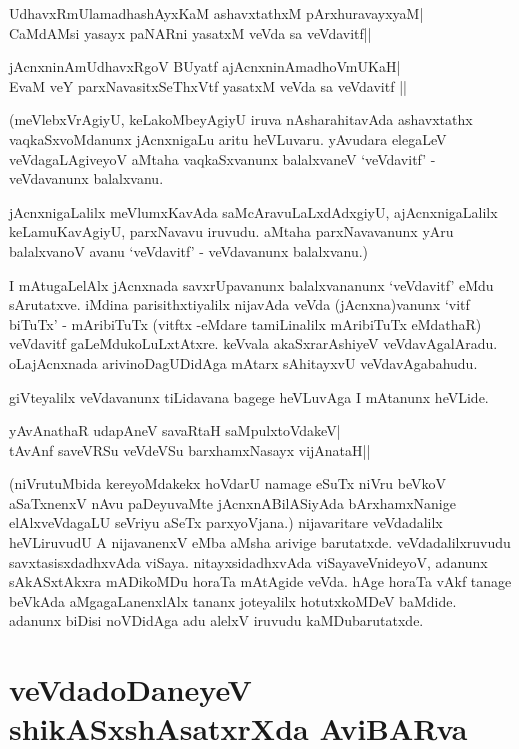 \begin{shloka}
UdhavxRmUlamadhashAyxKaM ashavxtathxM pArxhuravayxyaM|\label{13a}\\
CaMdAMsi yasayx paNARni yasatxM veVda sa veVdavitf||
\end{shloka}

\begin{shloka}
jAcnxninAmUdhavxRgoV BUyatf ajAcnxninAmadhoVmUKaH|\label{13b}\\
EvaM veY parxNavasitxSeThxVtf yasatxM veVda sa veVdavitf ||
\end{shloka}

(meVlebxVrAgiyU, keLakoMbeyAgiyU iruva nAsharahitavAda ashavxtathx  vaqkaSxvoMdanunx jAcnxnigaLu aritu heVLuvaru. yAvudara elegaLeV veVdagaLAgiveyoV aMtaha vaqkaSxvanunx balalxvaneV `veVdavitf' -veVdavanunx  balalxvanu.

jAcnxnigaLalilx meVlumxKavAda saMcAravuLaLxdAdxgiyU, ajAcnxnigaLalilx keLamuKavAgiyU, parxNavavu iruvudu. aMtaha parxNavavanunx yAru balalxvanoV avanu `veVdavitf' - veVdavanunx balalxvanu.)

I mAtugaLelAlx jAcnxnada savxrUpavanunx balalxvananunx `veVdavitf' eMdu sArutatxve. iMdina parisithxtiyalilx nijavAda veVda (jAcnxna)vanunx `vitf biTuTx' - mAribiTuTx (vitftx -eMdare tamiLinalilx mAribiTuTx eMdathaR) veVdavitf gaLeMdukoLuLxtAtxre. keVvala akaSxrarAshiyeV veVdavAgalAradu. oLajAcnxnada arivinoDagUDidAga mAtarx  sAhitayxvU veVdavAgabahudu.

giVteyalilx veVdavanunx tiLidavana bagege heVLuvAga I mAtanunx heVLide.
\begin{shloka}
yAvAnathaR udapAneV savaRtaH saMpulxtoVdakeV|\label{14}\\
tAvAnf saveVRSu veVdeVSu barxhamxNasayx vijAnataH||
\end{shloka}

(niVrutuMbida kereyoMdakekx  hoVdarU namage eSuTx niVru beVkoV aSaTxnenxV nAvu paDeyuvaMte jAcnxnABilASiyAda bArxhamxNanige elAlxveVdagaLU seVriyu aSeTx parxyoVjana.) nijavaritare veVdadalilx heVLiruvudU A nijavanenxV eMba aMsha arivige barutatxde. veVdadalilxruvudu savxtasisxdadhxvAda viSaya. nitayxsidadhxvAda viSayaveVnideyoV, adanunx sAkASxtAkxra mADikoMDu horaTa mAtAgide veVda. hAge horaTa vAkf tanage beVkAda aMgagaLanenxlAlx tananx joteyalilx hotutxkoMDeV baMdide. adanunx biDisi noVDidAga adu alelxV iruvudu kaMDubarutatxde.

\section*{veVdadoDaneyeV shikASxshAsatxrXda AviBARva}

